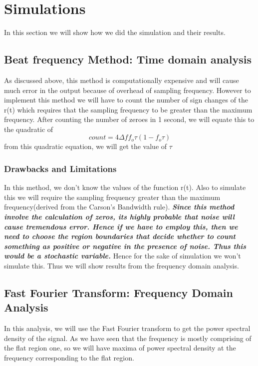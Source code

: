 \documentclass[12pt]{article}
\begin{document}
\section{Simulations}
In this section we will show how we did the simulation and their results. 
\subsection*{Beat frequency Method: Time domain analysis}
\begin{flushleft}
As discussed above, this method is computationally expensive and will cause much error in the output because of overhead of sampling frequency. However to implement this method we will have to count the number of sign changes of the r(t) which requires that the sampling frequency to be greater than the maximum frequency. 
After counting the number of zeroes in 1 second, we will equate this to the quadratic of
\[count = 4\Delta ff_o\tau(1-f_o\tau)\]
from this quadratic equation, we will get the value of $\tau$
\subsubsection*{Drawbacks and Limitations}
In this method, we don't know the values of the function r(t). Also to simulate this we will require the sampling frequency greater than the maximum frequency(derived from the Carson's Bandwidth rule). \textbf{\textit{Since this method involve the calculation of zeros, its highly probable that noise will cause tremendous error. Hence if we have to employ this, then we need to choose the region boundaries that decide whether to count something as positive or negative in the presence of noise. Thus this would be a stochastic variable.}} Hence for the sake of simulation we won't simulate this. Thus we will show results from the frequency domain analysis.\\

\end{flushleft}
\subsection*{Fast Fourier Transform: Frequency Domain Analysis}
In this analysis, we will use the Fast Fourier transform to get the power spectral density of the signal. As we have seen that the frequency is mostly comprising of the flat region one, so we will have maxima of power spectral density at the frequency corresponding to the flat region.\\
\end{document}
